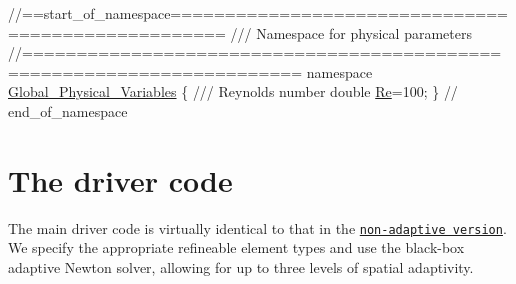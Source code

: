  
\begin{DoxyCodeInclude}
\textcolor{comment}{//==start\_of\_namespace===================================================}
\textcolor{comment}{/// Namespace for physical parameters}
\textcolor{comment}{}\textcolor{comment}{//=======================================================================}
\textcolor{keyword}{namespace }\hyperlink{namespaceGlobal__Physical__Variables}{Global\_Physical\_Variables}
\{\textcolor{comment}{}
\textcolor{comment}{ /// Reynolds number}
\textcolor{comment}{} \textcolor{keywordtype}{double} \hyperlink{namespaceGlobal__Physical__Variables_ab814e627d2eb5bc50318879d19ab16b9}{Re}=100;
\} \textcolor{comment}{// end\_of\_namespace}

\end{DoxyCodeInclude}




 

\hypertarget{index_main}{}\section{The driver code}\label{index_main}
The main driver code is virtually identical to that in the \href{../../driven_cavity/html/index.html#main}{\tt non-\/adaptive version}. We specify the appropriate refineable element types and use the black-\/box adaptive Newton solver, allowing for up to three levels of spatial adaptivity.



